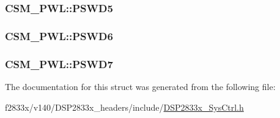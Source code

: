 \subsubsection[{P\+S\+W\+D5}]{ C\+S\+M\+\_\+\+P\+W\+L\+::\+P\+S\+W\+D5}\label{struct_c_s_m___p_w_l_a68f79eeb333c4baf2cc0902c14db22f0}
\hypertarget{struct_c_s_m___p_w_l_a4d58e243c2e2121bc0f87e12511421bd}{}
\subsubsection[{P\+S\+W\+D6}]{ C\+S\+M\+\_\+\+P\+W\+L\+::\+P\+S\+W\+D6}\label{struct_c_s_m___p_w_l_a4d58e243c2e2121bc0f87e12511421bd}
\hypertarget{struct_c_s_m___p_w_l_abb13ae8c5d8b99203e18d5b0ea9c5792}{}
\subsubsection[{P\+S\+W\+D7}]{ C\+S\+M\+\_\+\+P\+W\+L\+::\+P\+S\+W\+D7}\label{struct_c_s_m___p_w_l_abb13ae8c5d8b99203e18d5b0ea9c5792}


The documentation for this struct was generated from the following file\+:\begin{DoxyCompactItemize}
\item 
f2833x/v140/\+D\+S\+P2833x\+\_\+headers/include/\hyperlink{_d_s_p2833x___sys_ctrl_8h}{D\+S\+P2833x\+\_\+\+Sys\+Ctrl.\+h}\end{DoxyCompactItemize}
